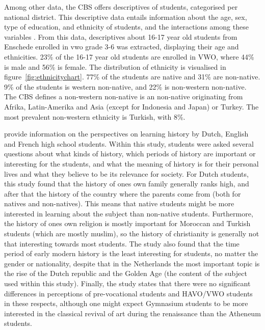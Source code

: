 Among other data, the CBS offers descriptives of students, categorised per national district. This descriptive data entails information about the age, sex, type of education, and ethnicity of students, and the interactions among these variables \cite{cbsethn}. From this data, descriptives about 16-17 year old students from Enschede enrolled in vwo grade 3-6 was extracted, displaying their age and ethnicities. 23\% of the 16-17 year old students are enrolled in VWO, where 44\% is male and 56\% is female. The distribution of ethnicity is visualised in figure~\ref{fig:ethnicitychart}. 77\% of the students are native and 31\% are non-native. 9\% of the students is western non-native, and 22\% is non-western non-native. The CBS defines a non-western non-native is an non-native originating from Afrika, Latin-Amerika and Asia (except for Indonesia and Japan) or Turkey. The most prevalent non-western ethnicity is Turkish, with 8\%.

 provide information on the perspectives on learning history by Dutch, English and French high school students. Within this study, students were asked several questions about what kinds of history, which periods of history are important or interesting for the students, and what the meaning of history is for their personal lives and what they believe to be its relevance for society. For Dutch students, this study found that the history of ones own family generally ranks high, and after that the history of the country where the parents come from (both for natives and non-natives). This means that native students might be more interested in learning about the subject than non-native students. Furthermore, the history of ones own religion is mostly important for Moroccan and Turkish students (which are mostly muslim), so the history of christianity is generally not that interesting towards most students. The study also found that the time period of early modern history is the least interesting for students, no matter the gender or nationality, despite that in the Netherlands the most important topic is the rise of the Dutch republic and the Golden Age (the content of the subject used within this study). Finally, the study states that there were no significant differences in perceptions of pre-vocational students and HAVO/VWO students in these respects, although one might expect Gymnasium students to be more interested in the classical revival of art during the renaissance than the Atheneum students.

